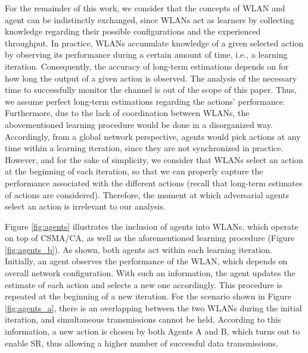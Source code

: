 \documentclass[preprint,12pt]{elsarticle}
\begin{document}
For the remainder of this work, we consider that the concepts of WLAN and agent can be indistinctly exchanged, since WLANs act as learners by collecting knowledge regarding their possible configurations and the experienced throughput. In practice, WLANs accumulate knowledge of a given selected action by observing its performance during a certain amount of time, i.e., a learning iteration. Consequently, the accuracy of long-term estimations depends on for how long the output of a given action is observed. The analysis of the necessary time to successfully monitor the channel is out of the scope of this paper. Thus, we assume perfect long-term estimations regarding the actions' performance. Furthermore, due to the lack of coordination between WLANs, the abovementioned learning procedure would be done in a disorganized way. Accordingly, from a global network perspective, agents would pick actions at any time within a learning iteration, since they are not synchronized in practice. However, and for the sake of simplicity, we consider that WLANs select an action at the beginning of each iteration, so that we can properly capture the performance associated with the different actions (recall that long-term estimates of actions are considered). Therefore, the moment at which adversarial agents select an action is irrelevant to our analysis.

Figure \ref{fig:agents} illustrates the inclusion of agents into WLANs, which operate on top of CSMA/CA, as well as the aforementioned learning procedure (Figure \ref{fig:agents_b}). As shown, both agents act within each learning iteration. Initially, an agent observes the performance of the WLAN, which depends on overall network configuration. With such an information, the agent updates the estimate of each action and selects a new one accordingly. This procedure is repeated at the beginning of a new iteration. For the scenario shown in Figure \ref{fig:agents_a}, there is an overlapping between the two WLANs during the initial iteration, and simultaneous transmissions cannot be held. According to this information, a new action is chosen by both Agents A and B, which turns out to enable SR, thus allowing a higher number of successful data transmissions.
\end{document}
